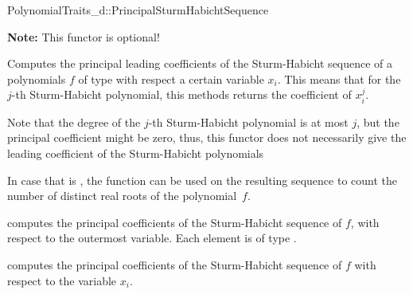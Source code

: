 \begin{ccRefConcept}{PolynomialTraits_d::PrincipalSturmHabichtSequence}

\textbf{Note:} This functor is optional!

\ccDefinition

Computes the principal leading coefficients of the Sturm-Habicht sequence 
of a polynomials $f$ of type  
with respect a certain variable $x_i$.
This means that for the $j$-th Sturm-Habicht polynomial, this methods returns
the coefficient of $x_i^j$. 

Note that the degree of the $j$-th Sturm-Habicht polynomial is at most $j$,
but the principal coefficient might be zero, thus, this functor does not
necessarily give the leading coefficient of the Sturm-Habicht polynomials

In case that  is , the function  can be used
on the resulting sequence to count the number of distinct real roots of
the polynomial~$f$.


\ccOperations
{}
         { computes the principal coefficients of the 
           Sturm-Habicht sequence of $f$, 
           with respect to the outermost variable. Each element is of type
           .}

         { computes the principal coefficients 
           of the Sturm-Habicht sequence of $f$ 
           with respect to the variable $x_i$.}


\ccSeeAlso

\\
\\
\\

\end{ccRefConcept}
